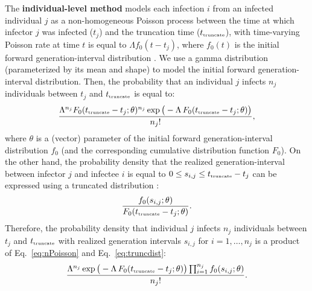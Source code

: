 \documentclass[12pt]{article}
\newcommand{\eref}[1]{Eq.~\ref{eq:#1}}
\newcommand{\tsub}[2]{#1_{{\textrm{\tiny #2}}}}
\begin{document}
The \textbf{individual-level method} models each infection $i$ from an infected individual $j$ as a non-homogeneous Poisson process between the time at which infector $j$ was infected ($t_j$) and the truncation time ($\tsub{t}{truncate}$), with time-varying Poisson rate at time $t$ is equal to $\Lambda f_0(t - t_j)$, where $f_0(t)$ is the initial forward generation-interval distribution \citep{daley2007introduction}.
We use a gamma distribution (parameterized by its mean and shape) to model the initial forward generation-interval distribution.
Then, the probability that an individual $j$ infects $n_j$ individuals between $t_j$ and $\tsub{t}{truncate}$ is equal to:
\begin{equation}
\frac{\Lambda^{n_j} F_0(\tsub{t}{truncate} - t_j ;\theta)^{n_j} \exp \big(- \Lambda\, F_0(\tsub{t}{truncate} - t_j ;\theta) \big)}{n_j!},
\label{eq:nPoisson}
\end{equation}
where $\theta$ is a (vector) parameter of the initial forward generation-interval distribution $f_0$ (and the corresponding cumulative distribution function $F_0$).
On the other hand, the probability density that the realized generation-interval between infector $j$ and infectee $i$ is equal to $0 \leq s_{i,j} \leq \tsub{t}{truncate} - t_j$ can be expressed using a truncated distribution \citep{lagakos1988nonparametric, kalbfleisch1991regression}:
\begin{equation}
\frac{f_0(s_{i, j}; \theta)}{F_0(\tsub{t}{truncate} - t_j ;\theta)}.
\label{eq:truncdist}
\end{equation}
Therefore, the probability density that individual $j$ infects $n_j$ individuals between $t_j$ and $\tsub{t}{truncate}$ with realized generation intervals $s_{i,j}$ for $i=1,\dots,n_j$ is a product of \eref{nPoisson} and \eref{truncdist}:
\begin{equation}
\frac{\Lambda^{n_j} \exp \big(- \Lambda\, F_0(\tsub{t}{truncate} - t_j ;\theta) \big) \prod_{i=1}^{n_j} f_0(s_{i, j}; \theta)}{n_j!}.
\end{equation}
\end{document}
